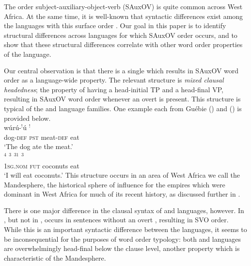 \documentclass[output=paper]{LSP/langsci}
\begin{document}
The order subject-auxiliary-object-verb (SAuxOV) is quite common across West Africa. At the same time, it is well-known that syntactic differences exist among the languages with this surface order \citep{Creissels2005typology}. Our goal in this paper is to identify structural differences across languages for which SAuxOV order occurs, and to show that these structural differences correlate with other word order properties of the language.

Our central observation is that there is a single  which results in SAuxOV word order as a language-wide property. The relevant structure is \textit{mixed clausal headedness}; the property of having a head-initial TP and a head-final VP, resulting in SAuxOV word order whenever an overt  is present. This structure is typical of the  and  language families. One example each from Gu\'ebie () and  () is provided below.
\ea 
\label{ex:1:sauxov}
\ea {} \\ 
\gll w\'ur\'u-$^!$\'u {$^!$}  {}  \\
{dog}-\textsc{def} \textsc{pst} meat-\textsc{def} eat\\
\glt `The dog ate the meat.'  \label{ex:1b:sauxov}
\ex {} \\ 
\gll {}$^{4}$ $^{3}$ $^{31}$ $^{3}$\\
\textsc{1sg}.\textsc{nom} \textsc{fut} coconuts eat \\
\glt `I will eat coconuts.'  \label{ex:1a:sauxov}
\z
\z
This structure occurs in an area of West Africa we call the Mandesphere, the historical sphere of influence for the  empires which were dominant in West Africa for much of its recent history, as discussed further in .

There is one major difference in the clausal syntax of  and  languages, however. In , but not in ,  occurs in sentences without an overt , resulting in SVO order. While this is an important syntactic difference between the languages, it seems to be inconsequential for the purposes of word order typology: both  and  languages are overwhelmingly head-final below the clause level, another property which is characteristic of the Mandesphere.
\end{document}
